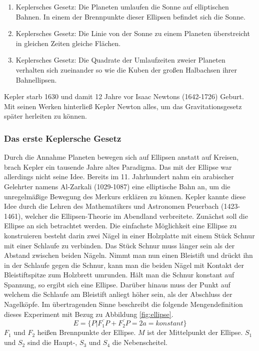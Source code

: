 \begin{enumerate}
	\item Keplersches Gesetz: Die Planeten umlaufen die Sonne auf elliptischen Bahnen. In einem der Brennpunkte dieser Ellipsen befindet sich die Sonne. 
	\item Keplersches Gesetz: Die Linie von der Sonne zu einem Planeten überstreicht in gleichen Zeiten gleiche Flächen.
	\item Keplersches Gesetz: Die Quadrate der Umlaufzeiten zweier Planeten verhalten sich zueinander so wie die Kuben der großen Halbachsen ihrer Bahnellipsen. 
\end{enumerate}   
Kepler starb 1630 und damit 12 Jahre vor Isaac Newtons (1642-1726) Geburt. Mit seinen Werken hinterließ Kepler Newton alles, um das Gravitationsgesetz später herleiten zu können. 
\subsubsection{Das erste Keplersche Gesetz}
Durch die Annahme Planeten bewegen sich auf Ellipsen anstatt auf Kreisen, brach Kepler ein tausende Jahre altes Paradigma. Das mit der Ellipse war allerdings nicht seine Idee. Bereits im 11. Jahrhundert nahm ein arabischer Gelehrter namens Al-Zarkali (1029-1087) eine elliptische Bahn an, um die unregelmäßige Bewegung des Merkurs erklären zu können. Kepler kannte diese Idee durch die Lehren des Mathematikers und Astronomen Peuerbach (1423-1461), welcher die Ellipsen-Theorie im Abendland verbreitete.  
\newpar
Zunächst soll die Ellipse an sich betrachtet werden. Die einfachste Möglichkeit eine Ellipse zu konstruieren besteht darin zwei Nägel in einer Holzplatte mit einem Stück Schnur mit einer Schlaufe zu verbinden. Das Stück Schnur muss länger sein als der Abstand zwischen beiden Nägeln. Nimmt man nun einen Bleistift und drückt ihn in der Schlaufe gegen die Schnur, kann man die beiden Nägel mit Kontakt der Bleistiftspitze zum Holzbrett umrunden. Hält man die Schnur konstant auf Spannung, so ergibt sich eine Ellipse. Darüber hinaus muss der Punkt auf welchem die Schlaufe am Bleistift anliegt höher sein, als der Abschluss der Nagelköpfe. Im übertragenden Sinne beschreibt die folgende Mengendefinition dieses Experiment mit Bezug zu Abbildung \ref{fig:ellipse}. 
\begin{equation}
E = \{P | \overline{F_{1}P} + \overline{F_{2}P} = 2a = konstant\}
\end{equation}
\ensuremath{F_{1}} und \ensuremath{F_{2}} heißen Brennpunkte der Ellipse. \ensuremath{M} ist der Mittelpunkt der Ellipse. \ensuremath{S_{1}} und \ensuremath{S_{2}} sind die Haupt-, \ensuremath{S_{3}} und \ensuremath{S_{4}} die Nebenscheitel.      
